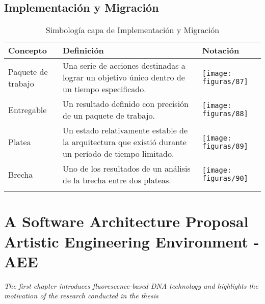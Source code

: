 \section{Implementación y Migración}
  \begin{longtable}
  	{m{3cm}m{4.8cm}m{5.2cm}}
  	\hline
  	\rowcolor[HTML]{0073a1}
  	{\color[HTML]{FFFFFF} \textbf{Concepto}} & {\color[HTML]{FFFFFF} \textbf{Definición}} & {\color[HTML]{FFFFFF} \textbf{Notación}} \\
  	\hline
	Paquete de trabajo & Una serie de acciones destinadas a lograr un objetivo único dentro de un tiempo especificado. & \texttt{[image: figuras/87]} \\ \hline
	Entregable & Un resultado definido con precisión de un paquete de trabajo. & \texttt{[image: figuras/88]} \\ \hline
	Platea & Un estado relativamente estable de la arquitectura que existió durante un período de tiempo limitado. & \texttt{[image: figuras/89]} \\ \hline
	Brecha & Uno de los resultados de un análisis de la brecha entre dos plateas. & \texttt{[image: figuras/90]} \\
	\bottomrule
	\captionsetup{width=.95\textwidth}
	\caption{Simbología capa de Implementación y Migración}
	\label{tabla36}
  \end{longtable}
  
\chapter{A Software Architecture Proposal Artistic Engineering Environment -AEE}
\label{apex:articulo}
\textit{The first chapter introduces fluorescence-based DNA technology and highlights the motivation of the research conducted in the thesis}
\vfill
\cleardoublepage
